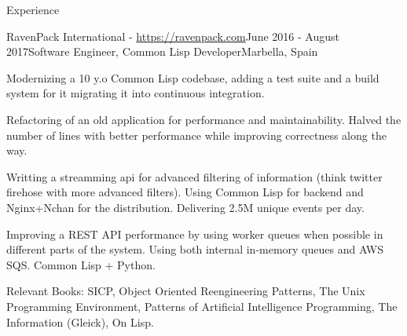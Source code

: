 \documentclass{resume} %
\begin{document}
\begin{rSection}{Experience}
\begin{rSubsection}{RavenPack International - \url{https://ravenpack.com}}{June 2016  - August 2017}{Software Engineer, Common Lisp Developer}{Marbella, Spain}
\item Modernizing a 10 y.o Common Lisp codebase, adding a test suite
  and a build system for it migrating it into continuous integration.
\item Refactoring of an old application for performance and
  maintainability. Halved the number of lines with better performance
  while improving correctness along the way.
\item Writting a streamming api for advanced filtering of information
  (think twitter firehose with more advanced filters). Using Common Lisp
  for backend and Nginx+Nchan for the distribution.  Delivering 2.5M
  unique events per day.
\item Improving a REST API performance by using worker queues when
  possible in different parts of the system. Using both internal
  in-memory queues and AWS SQS. Common Lisp + Python.
\item Relevant Books: SICP, Object Oriented Reengineering Patterns,
  The Unix Programming Environment, Patterns of Artificial
  Intelligence Programming, The Information (Gleick), On Lisp.
\end{rSubsection}



\end{rSection}
\end{document}
